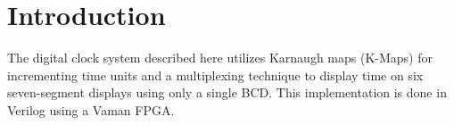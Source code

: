 \section{Introduction}
The digital clock system described here utilizes Karnaugh maps (K-Maps) for incrementing time units and a multiplexing technique to display time on six seven-segment displays using only a single BCD. This implementation is done in Verilog using a Vaman FPGA.
